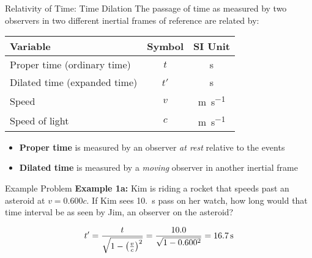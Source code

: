 \documentclass[12pt,compress,aspectratio=169]{beamer}
\newcommand{\bigsqrt}{\ensuremath\sqrt{1-\left(\frac{v}{c}\right)^2}}
\newcommand{\eq}[2]{\vspace{#1}{\Large\begin{displaymath}#2\end{displaymath}}}
\begin{document}
\begin{frame}{Relativity of Time: Time Dilation}
  The passage of time as measured by two observers in two different inertial
  frames of reference are related by:
  
  \eq{-.2in}{
    \boxed{t' =\frac{t}{\bigsqrt}}
  }
  \begin{center}
    \begin{tabular}{l|c|c}
      \rowcolor{pink}
      \textbf{Variable} & \textbf{Symbol} & \textbf{SI Unit}\\ \hline
      Proper time (ordinary time)  & $t$  & \si{\second} \\
      Dilated time (expanded time) & $t'$ & \si{\second} \\
      Speed           & $v$ & \si{\metre\per\second}\\
      Speed of light  & $c$ & \si{\metre\per\second}
    \end{tabular}
  \end{center}
  \begin{itemize}    
  \item\textbf{Proper time} is measured by an observer \emph{at rest} relative
    to the events
  \item\textbf{Dilated time} is measured by a \emph{moving} observer in another
    inertial frame
  \end{itemize}
\end{frame}



\begin{frame}{Example Problem}
  \textbf{Example 1a:} Kim is riding a rocket that speeds past an asteroid at
  $v=0.600c$. If Kim sees \SI{10.}{\second} pass on her watch, how long would
  that time interval be as seen by Jim, an observer on the asteroid?

  \begin{displaymath}
    t' =\frac{t}{\bigsqrt}=\frac{10.0}{\sqrt{1-0.600^2}}=\SI{16.7}{\second}
  \end{displaymath}

\end{frame}
\end{document}
